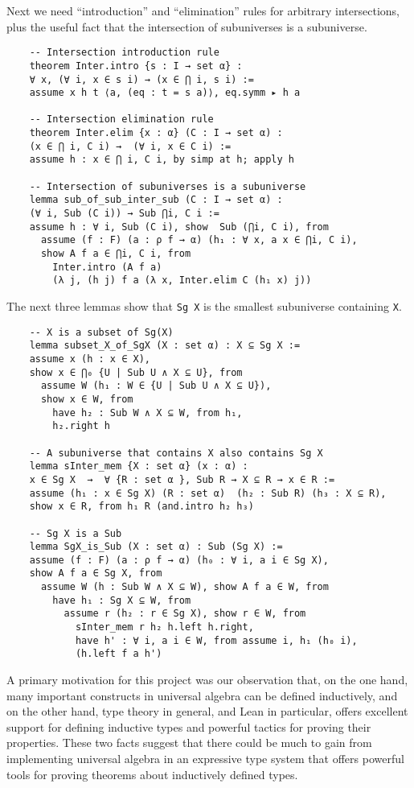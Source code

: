 \documentclass[11pt]{amsart}  %
\begin{document}
Next we need ``introduction'' and ``elimination'' rules for arbitrary intersections, plus the useful fact that the intersection of subuniverses is a subuniverse. 
\begin{lstlisting}
    -- Intersection introduction rule
    theorem Inter.intro {s : I → set α} : 
    ∀ x, (∀ i, x ∈ s i) → (x ∈ ⋂ i, s i) :=
    assume x h t ⟨a, (eq : t = s a)⟩, eq.symm ▸ h a
        
    -- Intersection elimination rule
    theorem Inter.elim {x : α} (C : I → set α) : 
    (x ∈ ⋂ i, C i) →  (∀ i, x ∈ C i) := 
    assume h : x ∈ ⋂ i, C i, by simp at h; apply h
        
    -- Intersection of subuniverses is a subuniverse
    lemma sub_of_sub_inter_sub (C : I → set α) : 
    (∀ i, Sub (C i)) → Sub ⋂i, C i :=
    assume h : ∀ i, Sub (C i), show  Sub (⋂i, C i), from 
      assume (f : F) (a : ρ f → α) (h₁ : ∀ x, a x ∈ ⋂i, C i), 
      show A f a ∈ ⋂i, C i, from 
        Inter.intro (A f a) 
        (λ j, (h j) f a (λ x, Inter.elim C (h₁ x) j))
      \end{lstlisting}        
The next three lemmas show that \lstinline{Sg X} is the smallest subuniverse  containing \lstinline{X}.
      \begin{lstlisting}        
    -- X is a subset of Sg(X)
    lemma subset_X_of_SgX (X : set α) : X ⊆ Sg X := 
    assume x (h : x ∈ X), 
    show x ∈ ⋂₀ {U | Sub U ∧ X ⊆ U}, from 
      assume W (h₁ : W ∈ {U | Sub U ∧ X ⊆ U}),  
      show x ∈ W, from 
        have h₂ : Sub W ∧ X ⊆ W, from h₁, 
        h₂.right h
        
    -- A subuniverse that contains X also contains Sg X
    lemma sInter_mem {X : set α} (x : α) : 
    x ∈ Sg X  →  ∀ {R : set α }, Sub R → X ⊆ R → x ∈ R := 
    assume (h₁ : x ∈ Sg X) (R : set α)  (h₂ : Sub R) (h₃ : X ⊆ R), 
    show x ∈ R, from h₁ R (and.intro h₂ h₃)
        
    -- Sg X is a Sub
    lemma SgX_is_Sub (X : set α) : Sub (Sg X) := 
    assume (f : F) (a : ρ f → α) (h₀ : ∀ i, a i ∈ Sg X), 
    show A f a ∈ Sg X, from 
      assume W (h : Sub W ∧ X ⊆ W), show A f a ∈ W, from 
        have h₁ : Sg X ⊆ W, from 
          assume r (h₂ : r ∈ Sg X), show r ∈ W, from 
            sInter_mem r h₂ h.left h.right,
            have h' : ∀ i, a i ∈ W, from assume i, h₁ (h₀ i),
            (h.left f a h')
\end{lstlisting}        
A primary motivation for this project was our observation that, on the one hand,
many important constructs in universal algebra can be defined inductively, and on the other hand, type theory in general, and Lean in particular, offers excellent support for defining inductive types and powerful tactics for proving their properties. These two facts suggest that there could be much to gain from implementing universal algebra in an expressive type system that offers powerful tools for proving theorems about inductively defined types.
\end{document}
